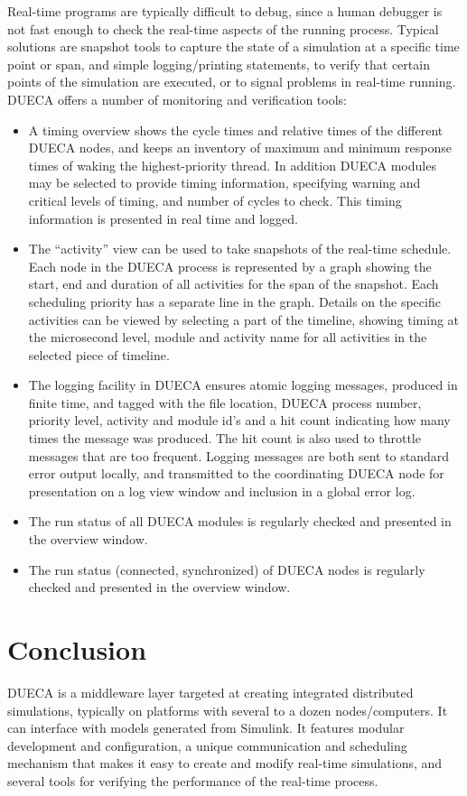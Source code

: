 \documentclass[11pt,a4paper,twoside]{scrartcl}
\begin{document}
Real-time programs are typically difficult to debug, since a human debugger is not fast enough to check the real-time aspects of the running process. Typical solutions are snapshot tools to capture the state of a simulation at a specific time point or span, and simple logging/printing statements, to verify that certain points of the simulation are executed, or to signal problems in real-time running. DUECA offers a number of monitoring and verification tools:
\begin{itemize}
\item A timing overview shows the cycle times and relative times of the different DUECA nodes, and keeps an inventory of maximum and minimum response times of waking the highest-priority thread. In addition DUECA modules may be selected to provide timing information, specifying warning and critical levels of timing, and number of cycles to check. This timing information is presented in real time and logged.
\item The ``activity'' view can be used to take snapshots of the real-time schedule. Each node in the DUECA process is represented by a graph showing the start, end and duration of all activities for the span of the snapshot. Each scheduling priority has a separate line in the graph. Details on the specific activities can be viewed by selecting a part of the timeline, showing timing at the microsecond level, module and activity name for all activities in the selected piece of timeline.
\item The logging facility in DUECA ensures atomic logging messages, produced in finite time, and tagged with the file location, DUECA process number, priority level,  activity and module id's and a hit count indicating how many times the message was produced. The hit count is also used to throttle messages that are too frequent. Logging messages are both sent to standard error output locally, and transmitted to the coordinating DUECA node for presentation on a log view window and inclusion in a global error log.
\item The run status of all DUECA modules is regularly checked and presented in the overview window.
\item The run status (connected, synchronized) of DUECA nodes is regularly checked and presented in the overview window.
\end{itemize}

\section{Conclusion}

DUECA is a middleware layer targeted at creating integrated distributed simulations, typically on platforms with several to a dozen nodes/computers. It can interface with models generated from Simulink. It features modular development and configuration, a unique communication and scheduling mechanism that makes it easy to create and modify real-time simulations, and several tools for verifying the performance of the real-time process.

%
\end{document}
